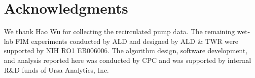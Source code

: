 \documentclass[%
reprint,
superscriptaddress,
 aps,
 pre,
]{revtex4-1}
\begin{document}
 \section{Acknowledgments}
 \label{sec:ack}
 We thank Hao Wu for collecting the recirculated pump data. 
 The remaining wet-lab FIM experiments conducted by ALD and designed by ALD \& TWR were supported by  NIH RO1 EB006006.
 The algorithm design, software  development, and analysis reported here was conducted by CPC  and was supported by internal R\&D funds of Ursa Analytics, Inc. 



\begin{figure} [htb]  %
    \center
    \def\pw{1.}
    \begin{minipage}[b]{.99\linewidth} %
\end{minipage}
\end{figure}
\end{document}

